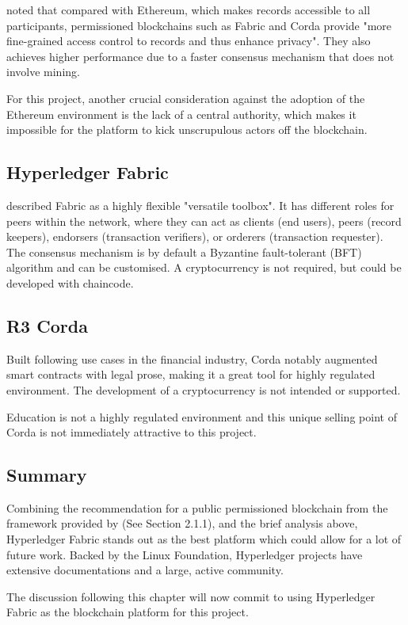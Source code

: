 \citet[p.3-4]{valenta2017comparison} noted that compared with Ethereum, which makes records accessible 
to all participants, permissioned blockchains such as Fabric and Corda provide "more fine-grained access 
control to records and thus enhance privacy". 
They also achieves higher performance due to a faster consensus mechanism that does not involve mining.

For this project, another crucial consideration against the adoption of the Ethereum environment is the 
lack of a central authority, which makes it impossible for the platform to kick unscrupulous actors off 
the blockchain.

\subsection*{Hyperledger Fabric}

\citet[p.7]{valenta2017comparison} described Fabric as a highly flexible "versatile toolbox". It 
has different roles for peers within the network, where they can act as clients (end users), peers 
(record keepers), endorsers (transaction verifiers), or orderers (transaction requester). The 
consensus mechanism is by default a Byzantine fault-tolerant (BFT) algorithm and can be customised. 
A cryptocurrency is not required, but could be developed with chaincode.

\subsection*{R3 Corda}

Built following use cases in the financial industry, Corda notably augmented smart contracts 
with legal prose, making it a great tool for highly regulated environment. The development of 
a cryptocurrency is not intended or supported. \citep{valenta2017comparison}

Education is not a highly regulated environment and this unique selling point of Corda is not 
immediately attractive to this project.

\subsection*{Summary}

Combining the recommendation for a public permissioned blockchain from the framework provided 
by \citet{wust2017you} (See Section 2.1.1), and the brief analysis above, Hyperledger Fabric 
stands out as the best platform which could allow for a lot of future work. Backed by the 
Linux Foundation, Hyperledger projects have extensive documentations and a large, 
active community. 

The discussion following this chapter will now commit to using Hyperledger 
Fabric as the blockchain platform for this project.

